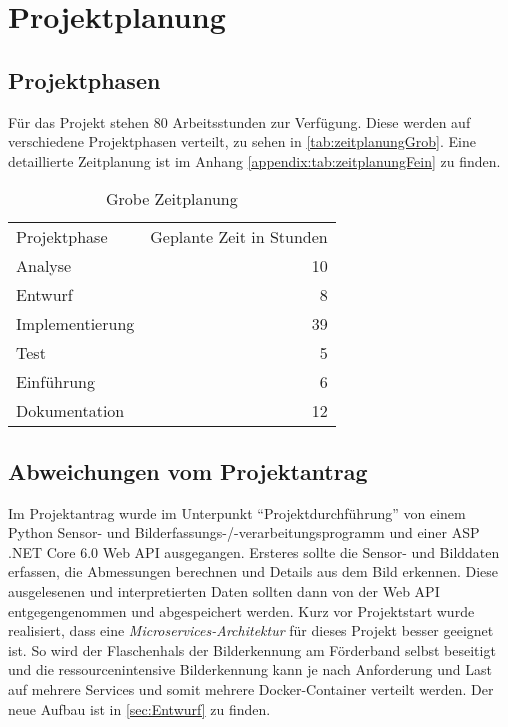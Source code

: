 \section{Projektplanung}


\subsection{Projektphasen}

Für das Projekt stehen 80 Arbeitsstunden zur Verfügung. Diese werden auf verschiedene Projektphasen verteilt, zu sehen in \vref{tab:zeitplanungGrob}. Eine detaillierte Zeitplanung ist im Anhang \vref{appendix:tab:zeitplanungFein} zu finden.

\begin{table}[htbp]
  \centering
  \renewcommand{\arraystretch}{1.25}
  \caption{Grobe Zeitplanung}
  \begin{tabular}{lr}
    Projektphase    & Geplante Zeit in Stunden \\
    Analyse         & 10                       \\
    Entwurf         & 8                        \\
    Implementierung & 39                       \\
    Test            & 5                        \\
    Einführung      & 6                        \\
    Dokumentation   & 12                       \\
  \end{tabular}
  \label{tab:zeitplanungGrob}
\end{table}


\subsection{Abweichungen vom Projektantrag}

Im Projektantrag wurde im Unterpunkt \enquote{Projektdurchführung} von einem Python Sensor- und Bilderfassungs-/-verarbeitungsprogramm und einer ASP .NET Core 6.0 Web API ausgegangen. Ersteres sollte die Sensor- und Bilddaten erfassen, die Abmessungen berechnen und Details aus dem Bild erkennen. Diese ausgelesenen und interpretierten Daten sollten dann von der Web API entgegengenommen und abgespeichert werden. Kurz vor Projektstart wurde realisiert, dass eine \textit{\gls{Microservices-Architektur}} für dieses Projekt besser geeignet ist. So wird der Flaschenhals der Bilderkennung am Förderband selbst beseitigt  und die ressourcenintensive Bilderkennung kann je nach Anforderung und Last auf mehrere Services und somit mehrere Docker-Container verteilt werden. Der neue Aufbau ist in \vref{sec:Entwurf} zu finden.




